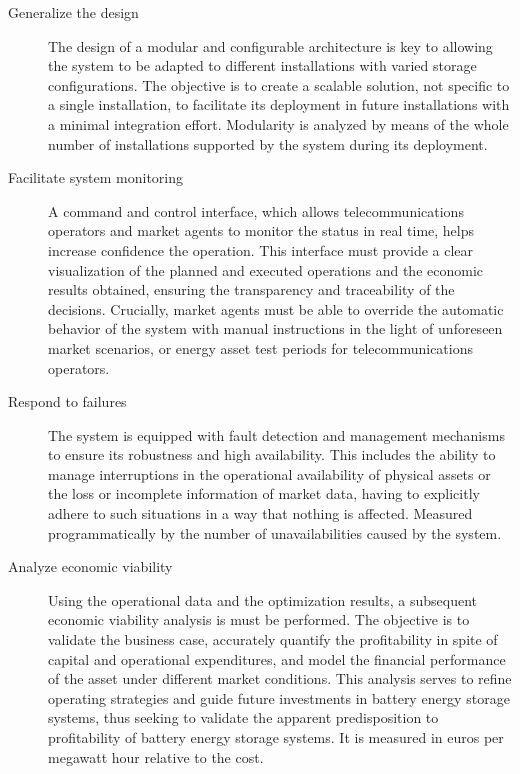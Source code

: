 \begin{description}
  \item[Generalize the design] The design of a modular and configurable architecture is key to allowing the system to be adapted to different installations with varied storage configurations. The objective is to create a scalable solution, not specific to a single installation, to facilitate its deployment in future installations with a minimal integration effort. Modularity is analyzed by means of the whole number of installations supported by the system during its deployment.

  \item[Facilitate system monitoring] A command and control interface, which allows telecommunications operators and market agents to monitor the status in real time, helps increase confidence the operation. This interface must provide a clear visualization of the planned and executed operations and the economic results obtained, ensuring the transparency and traceability of the decisions. Crucially, market agents must be able to override the automatic behavior of the system with manual instructions in the light of unforeseen market scenarios, or energy asset test periods for telecommunications operators.

  \item[Respond to failures] The system is equipped with fault detection and management mechanisms to ensure its robustness and high availability. This includes the ability to manage interruptions in the operational availability of physical assets or the loss or incomplete information of market data, having to explicitly adhere to such situations in a way that nothing is affected. Measured programmatically by the number of unavailabilities caused by the system.

  \item[Analyze economic viability] Using the operational data and the optimization results, a subsequent economic viability analysis is must be performed. The objective is to validate the business case, accurately quantify the profitability in spite of capital and operational expenditures, and model the financial performance of the asset under different market conditions. This analysis serves to refine operating strategies and guide future investments in battery energy storage systems, thus seeking to validate the apparent predisposition to profitability of battery energy storage systems. It is measured in euros per megawatt hour relative to the cost.

\end{description}

